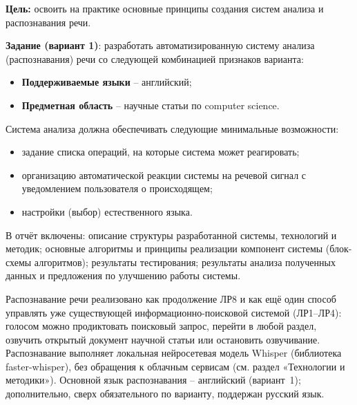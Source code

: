 
\textbf{Цель:} освоить на практике основные принципы создания систем
анализа и распознавания речи.

\vspace{1em}

\textbf{Задание (вариант 1)}: разработать автоматизированную систему
анализа (распознавания) речи со следующей комбинацией признаков
варианта:
\begin{itemize}
  \item \textbf{Поддерживаемые языки} -- английский;
  \item \textbf{Предметная область} -- научные статьи по
  computer science.
\end{itemize}

\vspace{1em}

Система анализа должна обеспечивать следующие минимальные
возможности:
\begin{itemize}
  \item задание списка операций, на которые система может реагировать;
  \item организацию автоматической реакции системы на речевой сигнал с
  уведомлением пользователя о происходящем;
  \item настройки (выбор) естественного языка.
\end{itemize}

В отчёт включены: описание структуры разработанной системы,
технологий и методик; основные алгоритмы и принципы реализации
компонент системы (блок-схемы алгоритмов); результаты тестирования;
результаты анализа полученных данных и предложения по улучшению
работы системы.

\vspace{1em}

Распознавание речи реализовано как продолжение ЛР8 и как ещё один
способ управлять уже существующей информационно-поисковой системой
(ЛР1--ЛР4): голосом можно продиктовать поисковый запрос, перейти в
любой раздел, озвучить открытый документ научной статьи или остановить
озвучивание. Распознавание выполняет локальная нейросетевая модель
Whisper (библиотека faster-whisper), без обращения к облачным
сервисам (см. раздел «Технологии и методики»). Основной язык
распознавания -- английский (вариант~1); дополнительно, сверх
обязательного по варианту, поддержан русский язык.
